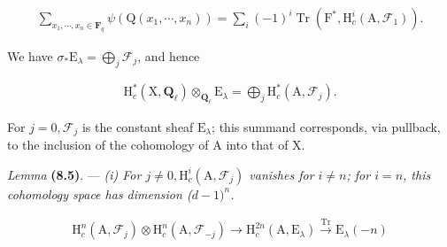 \documentclass[10pt,leqno]{article}
\begin{document}
\begin{equation*}\begin{gathered}\sum _{x_{1},\cdots ,x_{n} \in  \mathbf{F}_{q}} \psi (\mathrm{Q}(x_{1},\cdots ,x_{n})) = \sum _{i} (-1)^{i} \operatorname{Tr}(\mathrm{F}^{*}, \mathrm{H}_{c}^{i}(\mathrm{A},\mathcal{F} _{1})).\end{gathered}\tag{8.4.2}\end{equation*}

\noindent We have \(\sigma _{*}\mathrm{E}_{\lambda } = \bigoplus\limits_{j} \mathcal{F} _{j}\), and hence\par

\begin{equation*}\begin{gathered}\mathrm{H}_{c}^{*}(\mathrm{X},\mathbf{Q}_{\ell }) \otimes _{\mathbf{Q}_{\ell }} \mathrm{E}_{\lambda } = \bigoplus\limits_{j} \mathrm{H}_{c}^{*}(\mathrm{A},\mathcal{F} _{j}).\end{gathered}\tag{8.4.3}\end{equation*}

\noindent For \(j = 0, \mathcal{F} _{j}\) is the constant sheaf \(\mathrm{E}_{\lambda }\); this summand corresponds, via pullback, to the inclusion of the cohomology of \(\mathrm{A}\) into that of \(\mathrm{X}\).\par

\noindent \emph{Lemma} \textbf{(8.5)}. — {\itshape \textup{(i)} For \(j \ne  0, \mathrm{H}_{c}^{i}(\mathrm{A},\mathcal{F} _{j})\) vanishes for \(i \ne  n\); for \(i = n\), this cohomology space has dimension (\(d-1)^{n}\).}\par

\par

\begin{equation*}\begin{gathered}\mathrm{H}_{c}^{n}(\mathrm{A},\mathcal{F} _{j}) \otimes  \mathrm{H}_{c}^{n}(\mathrm{A},\mathcal{F} _{-j}) \longrightarrow  \mathrm{H}_{c}^{2n}(\mathrm{A},\mathrm{E}_{\lambda }) \xrightarrow{\operatorname{Tr}} \mathrm{E}_{\lambda }(-n)\end{gathered}\end{equation*}

\par

\par
\end{document}
